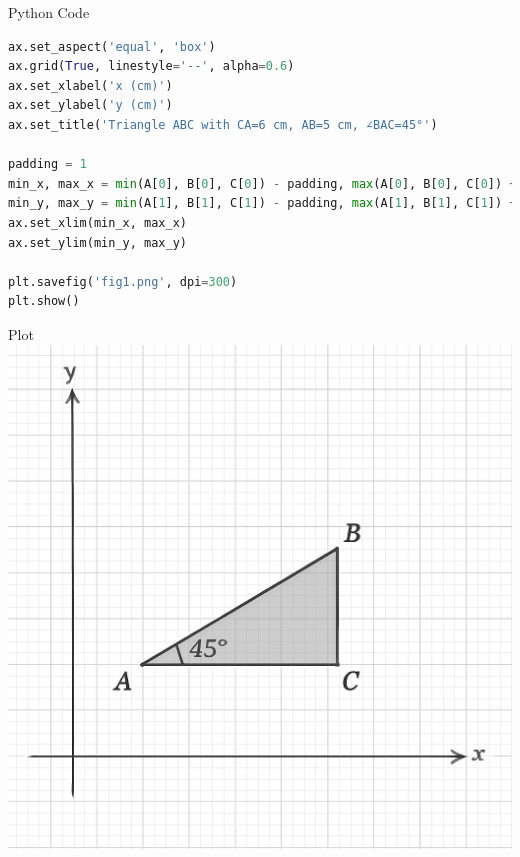 \documentclass{beamer}
\begin{document}
\begin{frame}[fragile]{Python Code}
\begin{lstlisting}[language=Python]
ax.set_aspect('equal', 'box')
ax.grid(True, linestyle='--', alpha=0.6)
ax.set_xlabel('x (cm)')
ax.set_ylabel('y (cm)')
ax.set_title('Triangle ABC with CA=6 cm, AB=5 cm, ∠BAC=45°')

padding = 1
min_x, max_x = min(A[0], B[0], C[0]) - padding, max(A[0], B[0], C[0]) + padding
min_y, max_y = min(A[1], B[1], C[1]) - padding, max(A[1], B[1], C[1]) + padding
ax.set_xlim(min_x, max_x)
ax.set_ylim(min_y, max_y)

plt.savefig('fig1.png', dpi=300)
plt.show()
\end{lstlisting}
\end{frame}




\begin{frame}{Plot}
    \centering
    \includegraphics[width=\columnwidth, height=0.8\textheight, keepaspectratio]{beamer/figs/fig1.png}     
\end{frame}
\end{document}
